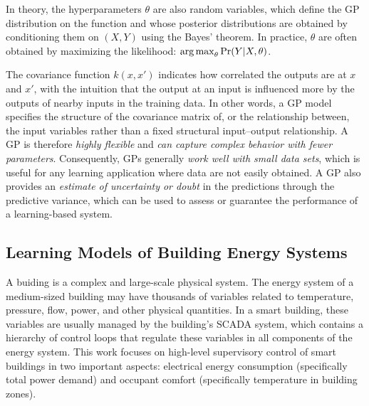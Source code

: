 In theory, the hyperparameters $\theta$ are also random variables, which define the GP distribution on the function and whose posterior distributions are obtained by conditioning them on $(X,Y)$ using the Bayes' theorem.
In practice, $\theta$ are often obtained by maximizing the likelihood: \(\operatorname*{arg\,max}_\theta \Pr(Y \vert X, \theta)\).

The covariance function \(k(x,x')\) indicates how correlated the outputs are at \(x\) and \(x'\), with the intuition that the output at an input is influenced more by the outputs of nearby inputs in the training data. 
In other words, a GP model specifies the structure of the covariance matrix of, or the relationship between, the input variables rather than a fixed structural input--output relationship.
A GP is therefore \emph{highly flexible} and \emph{can capture complex behavior with fewer parameters}.
Consequently, GPs generally \emph{work well with small data sets}, which is useful for any learning application where data are not easily obtained.
A GP also provides an \emph{estimate of uncertainty or doubt} in the predictions through the predictive variance, which can be used to assess or guarantee the performance of a learning-based system.

\subsection{Learning Models of Building Energy Systems} %
\label{sec:modeling:building}

A buiding is a complex and large-scale physical system.
The energy system of a medium-sized building may have thousands of variables related to temperature, pressure, flow, power, and other physical quantities.
In a smart building, these variables are usually managed by the building's SCADA system, which contains a hierarchy of control loops that regulate these variables in all components of the energy system.
This work focuses on high-level supervisory control of smart buildings in two important aspects: electrical energy consumption (specifically total power demand) and occupant comfort (specifically temperature in building zones).

